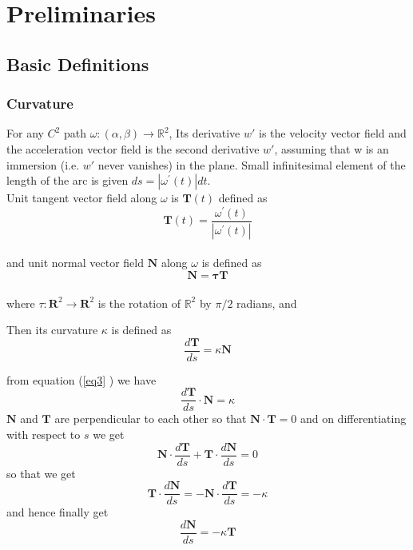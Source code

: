 \documentclass[oneside]{book}
\begin{document}
\chapter{Preliminaries }
\label{chap:c2}














 

\section{\textbf{Basic Definitions}}\label{s:1}
\subsection{Curvature}
\label{ss:1}
    
For any $C^{2}$ path $\omega:(\alpha, \beta) \rightarrow \mathbb{R}^{2}$, Its derivative $w'$ is the velocity vector field  and the acceleration vector field is the second derivative  $w'$, assuming that w is an immersion (i.e. $ w' $ never vanishes) in the plane. Small infinitesimal element of the length of the arc is given $d s=\left|\omega^{\prime}(t)\right| d t$.
\\Unit tangent vector field along $\omega$ is $\mathbf{T}(t)$ defined as \\

\begin{equation}
\label{eq1}  
\textbf{{T}}(t)=\frac{\omega^{\prime}(t)}{\left|\omega^{\prime}(t)\right|}
\end{equation}  \\
and unit normal vector field $\mathbf{N}$ along $\omega$ is defined as 
\begin{equation}
\label{eq2}  
     \mathbf{N}=\mathbf{\tau} \mathbf{T}
\end{equation} \\
   where $ \tau: \mathbf{R}^{2} \rightarrow \mathbf{R}^{2}$ is the rotation of $\mathbb{R}^{2}$ by $\pi / 2$ radians, and

  Then its curvature $\kappa$ is defined as
  \begin{equation}
  \label{eq3}  
    \frac{d \mathbf{T}}{d s}=\kappa \mathbf{N}
\end{equation}  

from equation (\ref{eq3} ) we have
$$ \frac{d \mathbf{T}}{d s} \cdot \mathbf{N} = \kappa $$
$\mathbf{N}$ and $\mathbf{T}$ are perpendicular to each other so that $\mathbf{N} \cdot \mathbf{T} = 0 $
 and on differentiating with respect to $s$ we get 
   $$ \mathbf{N} \cdot \frac{d \mathbf{T}}{d s} + \mathbf{T} \cdot \frac{d \mathbf{N}}{d s} = 0 $$ 
   so that we get
   \hfill \break  
   $$ \mathbf{T} \cdot \frac{d \mathbf{N}}{d s} = -  \mathbf{N} \cdot \frac{d \mathbf{T}}{d s} = -\kappa  $$ 
   and hence finally get 
\begin{equation}
\label{eq4}  
    \frac{d \mathbf{N}}{d s}=-\kappa \mathbf{T}
\end{equation}
\end{document}
